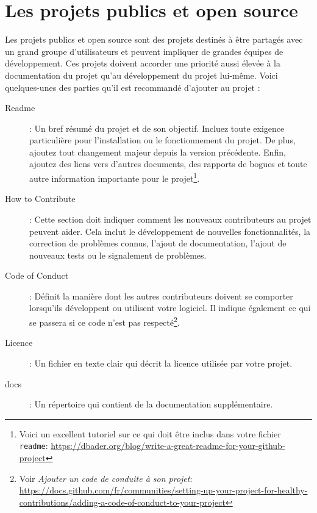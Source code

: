 \documentclass[a4paper,12pt]{book}
\begin{document}
\section{Les projets publics et open source}
Les projets publics et open source sont des projets destinés à être partagés avec un grand groupe d'utilisateurs et peuvent impliquer de grandes équipes de développement. Ces projets doivent accorder une priorité aussi élevée à la documentation du projet qu'au développement du projet lui-même. Voici quelques-unes des parties qu'il est recommandé d'ajouter au projet :
\begin{description}
	\item[Readme] : Un bref résumé du projet et de son objectif. Incluez toute exigence particulière pour l'installation ou le fonctionnement du projet. De plus, ajoutez tout changement majeur depuis la version précédente. Enfin, ajoutez des liens vers d'autres documents, des rapports de bogues et toute autre information importante pour le projet\footnote{Voici un excellent tutoriel sur ce qui doit être inclus dans votre fichier \texttt{readme}:  \url{https://dbader.org/blog/write-a-great-readme-for-your-github-project}}.
	\item[How to Contribute]: Cette section doit indiquer comment les nouveaux contributeurs au projet peuvent aider. Cela inclut le développement de nouvelles fonctionnalités, la correction de problèmes connus, l'ajout de documentation, l'ajout de nouveaux tests ou le signalement de problèmes.
	\item[Code of Conduct]: Définit la manière dont les autres contributeurs doivent se comporter lorsqu'ils développent ou utilisent votre logiciel. Il indique également ce qui se passera si ce code n'est pas respecté\footnote{Voir \textit{Ajouter un code de conduite à son projet}: \url{https://docs.github.com/fr/communities/setting-up-your-project-for-healthy-contributions/adding-a-code-of-conduct-to-your-project}}.
	\item[Licence]: Un fichier en texte clair qui décrit la licence utilisée par votre projet. 
	\item[docs] : Un répertoire qui contient de la documentation supplémentaire.
\end{description}
\medskip
\end{document}
